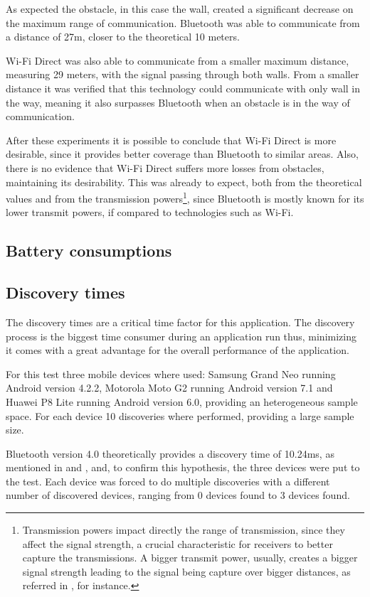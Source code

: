 As expected the obstacle, in this case the wall, created a significant decrease on the maximum range of communication. Bluetooth was able to communicate from a distance of 27m, closer to the theoretical 10 meters.

Wi-Fi Direct was also able to communicate from a smaller maximum distance, measuring 29 meters, with the signal passing through both walls. From a smaller distance it was verified that this technology could communicate with only wall in the way, meaning it also surpasses Bluetooth when an obstacle is in the way of communication.

After these experiments it is possible to conclude that Wi-Fi Direct is more desirable, since it provides better coverage than Bluetooth to similar areas. Also, there is no evidence that Wi-Fi Direct suffers more losses from obstacles, maintaining its desirability. This was already to expect, both from the theoretical values and from the transmission powers\footnote{Transmission powers impact directly the range of transmission, since they affect the signal strength, a crucial characteristic for receivers to better capture the transmissions. A bigger transmit power, usually, creates a bigger signal strength leading to the signal being capture over bigger distances, as referred in \cite{txpower}, for instance.}, since Bluetooth is mostly known for its lower transmit powers, if compared to technologies such as Wi-Fi.

\subsection{Battery consumptions}

\subsection{Discovery times}

The discovery times are a critical time factor for this application. The discovery process is the biggest time consumer during an application run thus, minimizing it comes with a great advantage for the overall performance of the application.

For this test three mobile devices where used: Samsung Grand Neo running Android version 4.2.2, Motorola Moto G2 running Android version 7.1 and Huawei P8 Lite running Android version 6.0, providing an heterogeneous sample space. For each device 10 discoveries where performed, providing a large sample size.

Bluetooth version 4.0 theoretically provides a discovery time of 10.24ms, as mentioned in \cite{btdisc1} and \cite{btdisc2}, and, to confirm this hypothesis, the three devices were put to the test. Each device was forced to do multiple discoveries with a different number of discovered devices, ranging from 0 devices found to 3 devices found.





